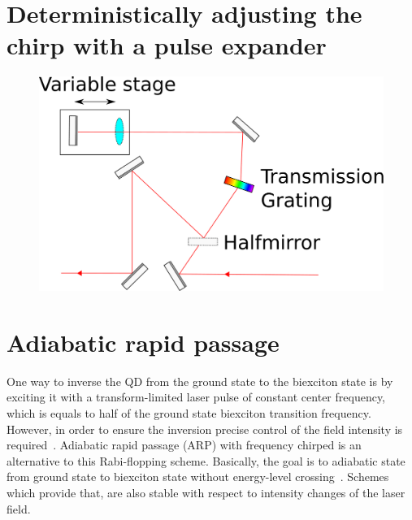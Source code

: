 \section{Deterministically adjusting the chirp with a pulse expander}

\textcite{martinez_3000_1987}

\begin{figure}[H]
	\centering
	\includegraphics[width=0.7\linewidth]{figures/chirp/pulse-expander}
	\caption{}
	\label{fig:pulse-expander}
\end{figure}



\section{Adiabatic rapid passage}
One way to inverse the \ac{QD} from the ground state to the biexciton state is by exciting it with a transform-limited laser pulse of constant center frequency, which is equals to half of the ground state biexciton transition frequency.
However, in order to ensure the inversion precise control of the field intensity is required~\cite{glassl_biexciton_2013}.
Adiabatic rapid passage  (\acs{ARP}) with frequency chirped is an alternative to this Rabi-flopping scheme.
Basically, the goal is to adiabatic state from ground state to biexciton state without energy-level crossing~\cite{hui_proposal_2008}.
Schemes which provide that, are also stable with respect to intensity changes of the laser field.

